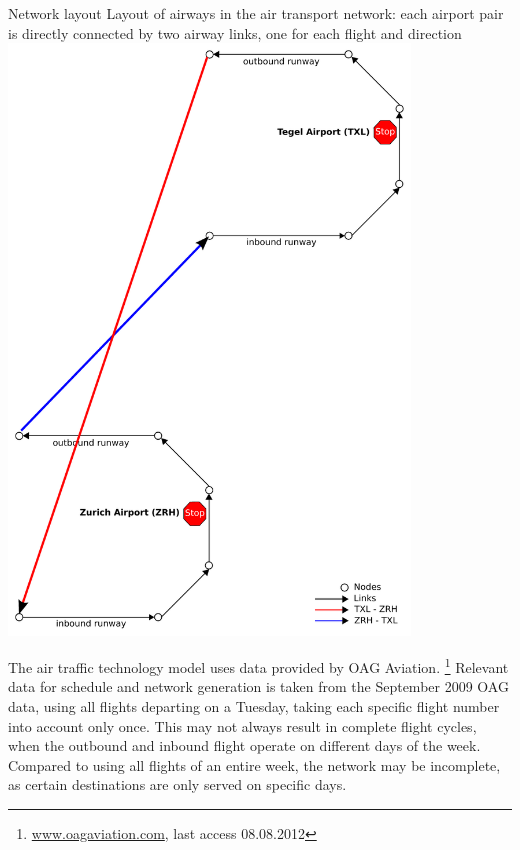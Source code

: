 {\citet{GretherFuerbasNagel2013FlightTechnologyPROCEDIA}}
%
%
\createfigure%
{Network layout}%
{Layout of airways in the air transport network: each airport pair is directly connected by two airway links, one for each flight and direction}%
{\label{fig:air_network_model}}
{\includegraphics[width=0.8\textwidth]{extending/figures/air/sf_airport_network_no_slide.pdf}}%
{\citet{GretherFuerbasNagel2013FlightTechnologyPROCEDIA}}

The air traffic technology model uses data provided by OAG  Aviation.%
\footnote{\url{www.oagaviation.com}, last access 08.08.2012}
Relevant data for schedule and network generation is taken from the September 2009 OAG  data, using all flights departing on a Tuesday, taking each specific flight number into account only once.
This may not always result in complete flight cycles, \eg when the outbound and inbound flight operate on different days of the week. 
Compared to using all flights of an entire week, the network may be incomplete, as certain destinations are only served on specific days.

